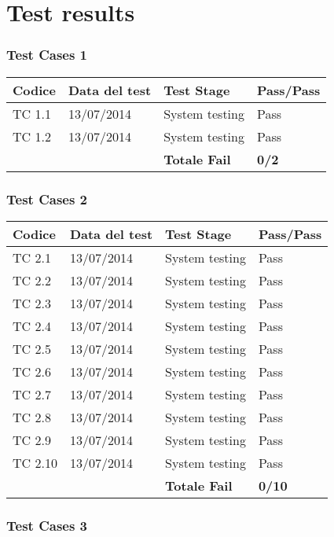 \chapter{Test results}

\subsection{Test Cases 1}

\begin{tabular}{|p{3cm}|p{3cm}|p{3cm}|p{3cm}|}
	\hline
	\rowcolor{Gray}
	\textbf{Codice} & \textbf{Data del test} & \textbf{Test Stage}  & \textbf{Pass/Pass}\tabularnewline
	\hline
	TC 1.1			& 13/07/2014 			& System testing		& Pass \tabularnewline
	\hline
	TC 1.2			& 13/07/2014 			& System testing		& Pass \tabularnewline
	\hline
					& 						& \textbf{Totale Fail}	& \textbf{0/2} \tabularnewline
	\hline
\end{tabular}

\subsection{Test Cases 2}

\begin{tabular}{|p{3cm}|p{3cm}|p{3cm}|p{3cm}|}
	\hline
	\rowcolor{Gray}
	\textbf{Codice} & \textbf{Data del test} & \textbf{Test Stage} & \textbf{Pass/Pass}\tabularnewline
	\hline
	TC 2.1			& 13/07/2014 			& System testing		& Pass \tabularnewline
	\hline
	TC 2.2			& 13/07/2014 			& System testing		& Pass \tabularnewline
	\hline
	TC 2.3			& 13/07/2014 			& System testing		& Pass \tabularnewline
	\hline
	TC 2.4			& 13/07/2014 			& System testing		& Pass \tabularnewline
	\hline
	TC 2.5			& 13/07/2014 			& System testing		& Pass \tabularnewline
	\hline
	TC 2.6			& 13/07/2014 			& System testing		& Pass \tabularnewline
	\hline
	TC 2.7			& 13/07/2014 			& System testing		& Pass \tabularnewline
	\hline
	TC 2.8			& 13/07/2014 			& System testing		& Pass \tabularnewline
	\hline
	TC 2.9			& 13/07/2014 			& System testing		& Pass \tabularnewline
	\hline
	TC 2.10			& 13/07/2014 			& System testing		& Pass \tabularnewline
	\hline
					& 						& \textbf{Totale Fail}	& \textbf{0/10} \tabularnewline
	\hline
\end{tabular}

\subsection{Test Cases 3}

